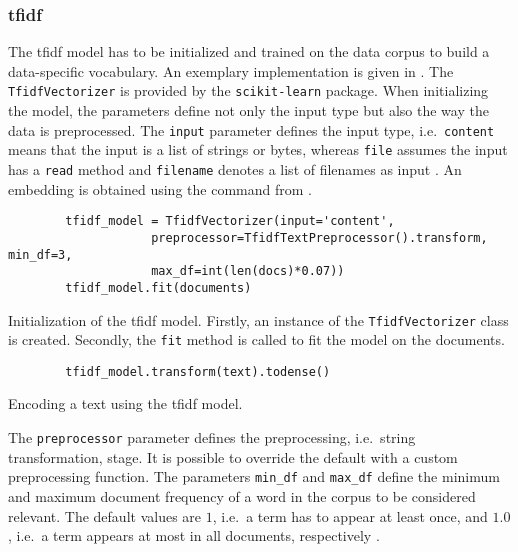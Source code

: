 \subsubsection*{\ac{tfidf}}\label{subsubsec:impl-tfidf}

The \ac{tfidf} model has to be initialized and trained on the data corpus to build a data-specific vocabulary.
An exemplary implementation is given in .
The \texttt{TfidfVectorizer} is provided by the \texttt{scikit-learn} package.
When initializing the model, the parameters define not only the input type but also the way the data is preprocessed.
The \texttt{input} parameter defines the input type, i.e.\ \texttt{content} means that the input is a list of strings or bytes, 
whereas \texttt{file} assumes the input has a \texttt{read} method and \texttt{filename} denotes a list of filenames as input \cite{tfidf-scikit-learn}.
An embedding is obtained using the command from .

\begin{listing}[htp]
    \begin{verbatim}
        tfidf_model = TfidfVectorizer(input='content', 
                    preprocessor=TfidfTextPreprocessor().transform, min_df=3, 
                    max_df=int(len(docs)*0.07))
        tfidf_model.fit(documents)
    \end{verbatim}
    \caption[Initialization of the \ac{tfidf} model]{Initialization of the \ac{tfidf} model.
    Firstly, an instance of the \texttt{TfidfVectorizer} class is created.
    Secondly, the \texttt{fit} method is called to fit the model on the documents.
    }
    \label{lst:impl-tfidf}
\end{listing}

\begin{listing}[htp]
    \begin{verbatim}
        tfidf_model.transform(text).todense()
    \end{verbatim}
    \caption[Encoding a text using the \ac{tfidf} model]{Encoding a text using the \ac{tfidf} model.
    }
    \label{lst:encode-tfidf}
\end{listing}

The \texttt{preprocessor} parameter defines the preprocessing, i.e.\ string transformation, stage.
It is possible to override the default with a custom preprocessing function.
The parameters \texttt{min\_df} and \texttt{max\_df} define the minimum and maximum document frequency of a word in the corpus to be considered relevant.
The default values are $1$, i.e.\ a term has to appear at least once, and $1.0$, i.e.\ a term appears at most in all documents, respectively \cite{tfidf-scikit-learn}.

